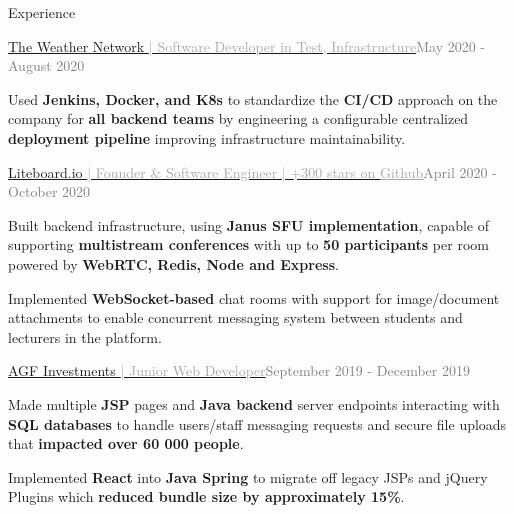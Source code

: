 \documentclass[hidelinks]{resume} %
\begin{document}
\begin{rSection}{\faBlackTie \hspace{0.25px} Experience}
\begin{rSubsection}{\href{https://www.theweathernetwork.com/}{The Weather Network \textcolor{darkgray}{| Software Developer in Test, Infrastructure}}}{\textcolor{gray}{May 2020 - August 2020}}{}
\begin{bulletpoints}
            \vspace{-.13cm}
             \item Used \textbf{Jenkins, Docker, and K8s} to standardize the \textbf{CI/CD} approach on the company for \textbf{all backend teams} by engineering a configurable centralized \textbf{deployment pipeline} improving infrastructure maintainability.
             \vspace{-.25cm}
        \end{bulletpoints}
\end{rSubsection}
\begin{rSubsection}{\href{https://github.com/jeverd/lecture-experience}{Liteboard.io \textcolor{darkgray}{| Founder \& Software Engineer | +300 stars on \underline{Github}}}}{\textcolor{gray}{April 2020 - October 2020}}{}
        \par
        \begin{bulletpoints}
            \vspace{-.10cm}
            \item Built backend infrastructure, using \textbf{Janus SFU implementation}, capable of supporting \textbf{multistream conferences} with up to \textbf{50 participants} per room powered by \textbf{WebRTC, Redis, Node and Express}.
             \vspace{-.13cm}
            \item Implemented \textbf{WebSocket-based} chat rooms with support for image/document attachments to enable concurrent messaging system between students and lecturers in the platform.
            \vspace{-.25cm}
        \end{bulletpoints}
\end{rSubsection}
\begin{rSubsection}{\href{https://www.agf.com/ca/en/index.jsp}{AGF Investments \textcolor{darkgray}{| Junior Web Developer}}}{\textcolor{gray}{September 2019 - December 2019}}{}
        \par
        \begin{bulletpoints}
            \vspace{-.10cm}
            \item Made multiple \textbf{JSP} pages and \textbf{Java backend} server endpoints interacting with \textbf{SQL databases} to handle users/staff messaging requests and secure file uploads that \textbf{impacted over 60 000 people}.
            \vspace{-.13cm}
             \item Implemented \textbf{React} into \textbf{Java Spring} to migrate off legacy JSPs and jQuery Plugins which \textbf{reduced bundle size by approximately 15\%}.

\end{bulletpoints}
\end{rSubsection}
\end{rSection}
\end{document}
